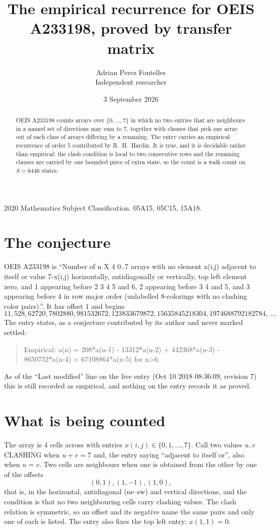 \documentclass[11pt,a4paper]{article}
\title{The empirical recurrence for OEIS A233198, proved by transfer matrix}
\author{Adrian Perez Fontelles\\ \small Independent researcher}
\date{3 September 2026}
\theoremstyle{plain}
\theoremstyle{definition}
\begin{document}
\maketitle

\begin{abstract}
OEIS A233198 counts arrays over $\{0,\dots,7\}$ in which no two entries that are neighbours in
a named set of directions may sum to $7$, together with clauses that pick one array out of
each class of arrays differing by a renaming. The entry carries an empirical recurrence of
order $5$ contributed by R.~H.~Hardin. It is true, and it is decidable rather than
empirical: the clash condition is local to two consecutive rows and the renaming clauses are
carried by one bounded piece of extra state, so the count is a walk count on $S=6446$ states.
\end{abstract}

\noindent\small 2020 Mathematics Subject Classification. 05A15, 05C15, 15A18.\normalsize

\section{The conjecture}

OEIS A233198 is ``Number of n X 4 0..7 arrays with no element x(i,j) adjacent to itself or value 7-x(i,j) horizontally, antidiagonally or vertically, top left element zero, and 1 appearing before 2 3 4 5 and 6, 2 appearing before 3 4 and 5, and 3 appearing before 4 in row major order (unlabelled 8-colorings with no clashing color pairs).''. It has offset $1$ and begins
\[
11, 528, 62720, 7802880, 981532672, 123833679872, 15635845218304, 1974688792182784,\ \dots
\]
The entry states, as a conjecture contributed by its author and never marked settled:
\begin{quote}
Empirical: a(n) = 208*a(n-1) - 13312*a(n-2) + 442368*a(n-3) - 8650752*a(n-4) + 67108864*a(n-5) for n>6.
\end{quote}
As of the ``Last modified'' line on the live entry (Oct 10 2018 08:36:09, revision 7) this is still
recorded as empirical, and nothing on the entry records it as proved.

\section{What is being counted}

The array is $4$ cells across with entries $x(i,j)\in\{0,1,\dots,7\}$. Call two values $u,v$ CLASHING
when $u+v=7$ and, the entry saying ``adjacent to itself or'', also when $u=v$. Two cells are neighbours when one is obtained from the other by one of
the offsets
\[
(0,1), (1,-1), (1,0),
\]
that is, in the horizontal, antidiagonal (ne--sw) and vertical directions, and the condition is that no two neighbouring cells carry
clashing values. The clash relation is symmetric, so an offset and its negative name the
same pairs and only one of each is listed. The entry also fixes the top left entry: $x(1,1)=0$.
\end{document}
